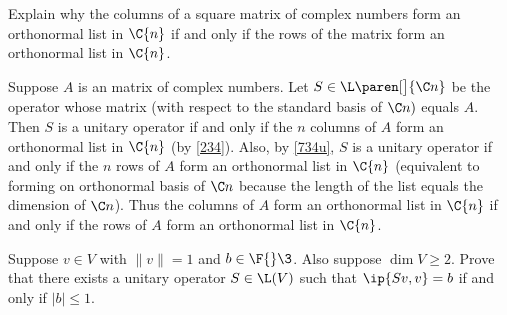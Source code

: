 \pagebreak[3]

\exercise
Explain why the columns of a square matrix of complex numbers form an orthonormal list in $\C{n}$ if and only if the rows of the matrix form an orthonormal list in $\C{n}$.

\begin{Solution}
Suppose $A$ is an  matrix of complex numbers. Let $S \in \L\paren[\big]{\C n}$ be the operator whose matrix (with respect to the standard basis of $\C n)$ equals $A$. Then $S$ is a unitary operator if and only if the $n$ columns of $A$ form an orthonormal list in $\C{n}$ (by \ref{234}). Also, by \ref{734u}, $S$ is a unitary operator if and only if the $n$ rows of $A$ form an orthonormal list in $\C{n}$ (equivalent to forming on orthonormal basis of $\C n$ because the length of the list equals the dimension of $\C n$). Thus the columns of $A$ form an orthonormal list in $\C{n}$ if and only if the rows of $A$ form an orthonormal list in $\C{n}$.
\end{Solution}

\exercise
Suppose $v \in V$ with $\|v\| = 1$ and $b \in \F{}\3$. Also suppose $\dim V \ge 2$. Prove that there exists a unitary operator $S \in \L(V)$ such that $\ip{Sv, v} = b$ if and only if $|b| \le 1$.

